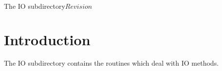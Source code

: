 %   

\begin{cactuspart}{7}{The IO subdirectory}{}{$Revision$}
\renewcommand{\thepage}{\Alph{part}\arabic{page}}

\chapter{Introduction}

The IO subdirectory contains the routines which deal with IO methods.

\end{cactuspart}
